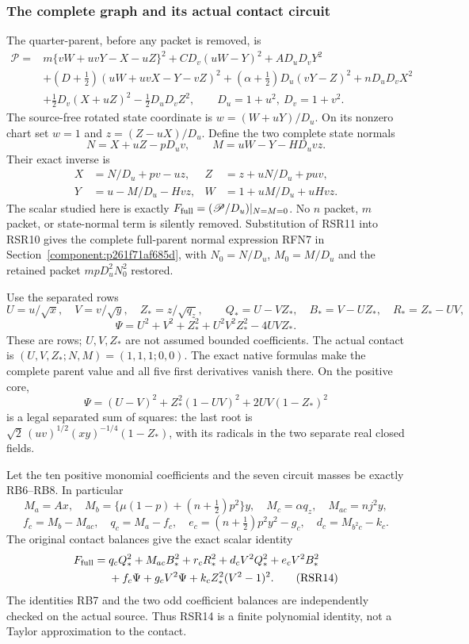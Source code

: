 \subsubsection*{The complete graph and its actual contact circuit}

The quarter-parent, before any packet is removed, is
\begin{align*}
\mathscr P={}&m\{vW+uvY-X-uZ\}^2
 +CD_v(uW-Y)^2+AD_uD_vY^2\\
&+(D+\tfrac12)(uW+uvX-Y-vZ)^2
 +(\alpha+\tfrac12)D_u(vY-Z)^2+nD_uD_vX^2\\
&+\tfrac12D_v(X+uZ)^2-\tfrac12D_uD_vZ^2,
\qquad D_u=1+u^2,\ D_v=1+v^2.
 \tag{RSR10}
\end{align*}
The source-free rotated state coordinate is $w=(W+uY)/D_u$.
On its nonzero chart set $w=1$ and $z=(Z-uX)/D_u$. Define
the two complete state normals
\[
 N=X+uZ-pD_uv,\qquad M=uW-Y-HD_uvz.
\]
Their exact inverse is
\[
\begin{aligned}
 X&=N/D_u+pv-uz,& Z&=z+uN/D_u+puv,\\
 Y&=u-M/D_u-Hvz,& W&=1+uM/D_u+uHvz.
\end{aligned}
 \tag{RSR11}
\]
The scalar studied here is exactly
$F_{\rm full}=(\mathscr P/D_u)|_{N=M=0}$.
No $n$ packet, $m$ packet, or state-normal term is silently removed.
Substitution of RSR11 into RSR10 gives the complete full-parent
normal expression RFN7 in Section~\ref{component:p261f71af685d}, with
$N_0=N/D_u$, $M_0=M/D_u$ and the retained packet
$mpD_u^2N_0^2$ restored.

Use the separated rows
\[
 U=u/\sqrt x,\quad V=v/\sqrt y,\quad Z_*=z/\sqrt{q_z},\qquad
 Q_*=U-VZ_*,\quad B_*=V-UZ_*,\quad R_*=Z_*-UV,
\]
\[
 \Psi=U^2+V^2+Z_*^2+U^2V^2Z_*^2-4UVZ_*.
 \tag{RSR12}
\]
These are rows; $U,V,Z_*$ are not assumed bounded coefficients.
The actual contact is $(U,V,Z_*;N,M)=(1,1,1;0,0)$.
The exact native formulas make the complete parent value and all five
first derivatives vanish there. On the positive core,
\[
 \Psi=(U-V)^2+Z_*^2(1-UV)^2+2UV(1-Z_*)^2
 \tag{RSR13}
\]
is a legal separated sum of squares: the last root is
$\sqrt2\,(uv)^{1/2}(xy)^{-1/4}(1-Z_*)$, with its radicals in
the two separate real closed fields.

Let the ten positive monomial coefficients and the seven circuit
masses be exactly RB6--RB8. In particular
\[
 M_a=Ax,\quad M_b=\{\mu(1-p)+(n+\tfrac12)p^2\}y,\quad
 M_c=\alpha q_z,\quad M_{ac}=nj^2y,
\]
\[
 f_c=M_b-M_{ac},\quad q_c=M_a-f_c,\quad
 e_c=(n+\tfrac12)p^2y^2-g_c,\quad d_c=M_{b^2c}-k_c.
\]
The original contact balances give the exact scalar identity
\begin{align*}
 F_{\rm full}={}&q_cQ_*^2+M_{ac}B_*^2+r_cR_*^2
  +d_cV^2Q_*^2+e_cV^2B_*^2\\
 &+f_c\Psi+g_cV^2\Psi+k_cZ_*^2(V^2-1)^2.
 \tag{RSR14}
\end{align*}
The identities RB7 and the two odd coefficient balances are independently
checked on the actual source. Thus RSR14 is a finite polynomial identity,
not a Taylor approximation to the contact.

